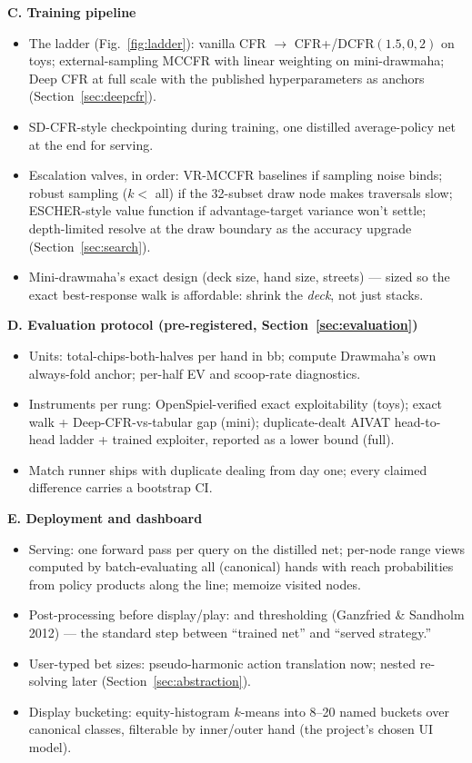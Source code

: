 \textbf{C. Training pipeline}
\begin{itemize}
\item The ladder (Fig.~\ref{fig:ladder}): vanilla CFR $\to$ CFR+/DCFR$(1.5,0,2)$ on toys; external-sampling MCCFR with linear weighting on mini-drawmaha; Deep CFR at full scale with the published hyperparameters as anchors (Section~\ref{sec:deepcfr}).
\item SD-CFR-style checkpointing during training, one distilled average-policy net at the end for serving.
\item Escalation valves, in order: VR-MCCFR baselines if sampling noise binds; robust sampling ($k<$ all) if the 32-subset draw node makes traversals slow; ESCHER-style value function if advantage-target variance won't settle; depth-limited resolve at the draw boundary as the accuracy upgrade (Section~\ref{sec:search}).
\item[$\circ$] Mini-drawmaha's exact design (deck size, hand size, streets) --- sized so the exact best-response walk is affordable: shrink the \emph{deck}, not just stacks.
\end{itemize}

\textbf{D. Evaluation protocol (pre-registered, Section~\ref{sec:evaluation})}
\begin{itemize}
\item Units: total-chips-both-halves per hand in bb; compute Drawmaha's own always-fold anchor; per-half EV and scoop-rate diagnostics.
\item Instruments per rung: OpenSpiel-verified exact exploitability (toys); exact walk + Deep-CFR-vs-tabular gap (mini); duplicate-dealt AIVAT head-to-head ladder + trained exploiter, reported as a lower bound (full).
\item Match runner ships with duplicate dealing from day one; every claimed difference carries a bootstrap CI.
\end{itemize}

\textbf{E. Deployment and dashboard}
\begin{itemize}
\item Serving: one forward pass per query on the distilled net; per-node range views computed by batch-evaluating all (canonical) hands with reach probabilities from policy products along the line; memoize visited nodes.
\item Post-processing before display/play:  and thresholding (Ganzfried \& Sandholm 2012) --- the standard step between ``trained net'' and ``served strategy.''
\item User-typed bet sizes: pseudo-harmonic action translation now; nested re-solving later (Section~\ref{sec:abstraction}).
\item Display bucketing: equity-histogram $k$-means into 8--20 named buckets over canonical classes, filterable by inner/outer hand (the project's chosen UI model).
\end{itemize}

